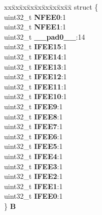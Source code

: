 \begin{DoxyCompactItemize}
\begin{tabbing}
\end{tabbing}\item 
\mbox{\label{unionSIU__tag_1_1SIU__IFEER__tag_a3cb1c0ae5fba96b843e4ff493a1a5440}} 
\begin{tabbing}
xx\=xx\=xx\=xx\=xx\=xx\=xx\=xx\=xx\=\kill
struct \{\\
\>uint32\_t {\bfseries NFEE0}:1\\
\>uint32\_t {\bfseries NFEE1}:1\\
\>uint32\_t {\bfseries \_\_pad0\_\_}:14\\
\>uint32\_t {\bfseries IFEE15}:1\\
\>uint32\_t {\bfseries IFEE14}:1\\
\>uint32\_t {\bfseries IFEE13}:1\\
\>uint32\_t {\bfseries IFEE12}:1\\
\>uint32\_t {\bfseries IFEE11}:1\\
\>uint32\_t {\bfseries IFEE10}:1\\
\>uint32\_t {\bfseries IFEE9}:1\\
\>uint32\_t {\bfseries IFEE8}:1\\
\>uint32\_t {\bfseries IFEE7}:1\\
\>uint32\_t {\bfseries IFEE6}:1\\
\>uint32\_t {\bfseries IFEE5}:1\\
\>uint32\_t {\bfseries IFEE4}:1\\
\>uint32\_t {\bfseries IFEE3}:1\\
\>uint32\_t {\bfseries IFEE2}:1\\
\>uint32\_t {\bfseries IFEE1}:1\\
\>uint32\_t {\bfseries IFEE0}:1\\
\} {\bfseries B}\\


\end{tabbing}
\end{DoxyCompactItemize}
